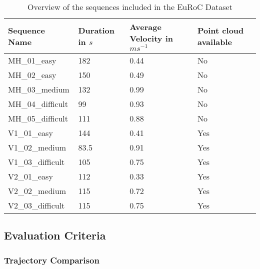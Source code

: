 	\begin{table}
	\caption{Overview of the sequences included in the EuRoC Dataset}
	\begin{tabular}{ |p{3cm}||p{3cm}|p{3cm}|p{3cm}|}
	\hline
	Sequence Name& Duration in $s$ & Average Velocity in $ms^{-1}$ &Point cloud available\\
	\hline
	MH\_01\_easy & 182 & 0.44 & No\\
	MH\_02\_easy & 150 & 0.49 & No\\
	MH\_03\_medium & 132 & 0.99 & No\\
	MH\_04\_difficult & 99 & 0.93 & No\\
	MH\_05\_difficult & 111 & 0.88 & No\\
	V1\_01\_easy & 144 & 0.41 & Yes\\
	V1\_02\_medium & 83.5 & 0.91 & Yes\\
	V1\_03\_difficult & 105 & 0.75 & Yes\\
	V2\_01\_easy & 112 & 0.33 & Yes\\
	V2\_02\_medium & 115 & 0.72 & Yes\\
	V2\_03\_difficult & 115 & 0.75 & Yes\\
	\hline
	\end{tabular}
	\label{table:euroctable}
	\end{table}

\subsection{Evaluation Criteria}
\subsubsection{Trajectory Comparison}

